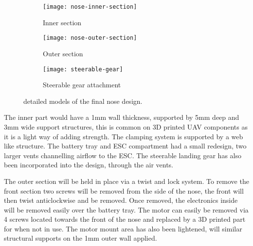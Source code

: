 \documentclass[../../main.tex]{subfiles}
\begin{document}
\begin{figure}[H]
    \centering
    \begin{subfigure}[b]{0.6\columnwidth}
        \centering
        \texttt{[image: nose-inner-section]}
        \caption{Inner section}
        \label{fig:nose-design:inner}
    \end{subfigure}
    
    \begin{subfigure}[b]{0.6\columnwidth}
        \centering
        \texttt{[image: nose-outer-section]}
        \caption{Outer section}
        \label{fig:nose-design:outer}
    \end{subfigure}

    \begin{subfigure}[b]{0.6\columnwidth}
        \centering
        \texttt{[image: steerable-gear]}
        \caption{Steerable gear attachment}
        \label{fig:nose-design:steerable-nose-gear}
    \end{subfigure}
    
    \caption{detailed models of the final nose design.}
    \label{fig:nose-design}
\end{figure} 


The inner part would have a 1mm wall thickness, supported by 5mm deep and 3mm wide support structures, this is common on 3D printed UAV components as it is a light way of adding strength.
The clamping system is supported by a web like structure.
The battery tray and ESC compartment had a small redesign, two larger vents channelling airflow to the ESC.
The steerable landing gear has also been incorporated into the design, through the air vents. 


The outer section will be held in place via a twist and lock system.
To remove the front section two screws will be removed from the side of the nose, the front will then twist anticlockwise and be removed.
Once removed, the electronics inside will be removed easily over the battery tray.
The motor can easily be removed via 4 screws located towards the front of the nose and replaced by a 3D printed part for when not in use.
The motor mount area has also been lightened, will similar structural supports on the 1mm outer wall applied. 
\end{document}
